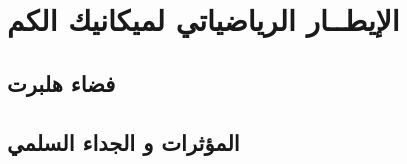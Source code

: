 
\chapter{الإيطــار الرياضياتي لميكانيك الكم} %

\label{Chapter2} 
\section{فضاء هلبرت}

\section{المؤثرات و الجداء السلمي}

